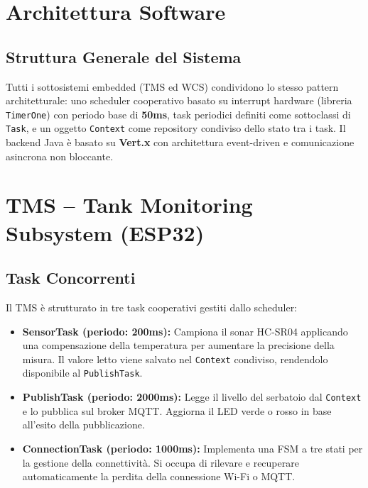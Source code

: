 \documentclass[12pt, a4paper]{article}
\begin{document}
\section{Architettura Software}

\subsection{Struttura Generale del Sistema}

Tutti i sottosistemi embedded (TMS ed WCS) condividono lo stesso pattern architetturale: uno scheduler cooperativo basato su interrupt hardware (libreria \texttt{TimerOne}) con periodo base di \textbf{50ms}, task periodici definiti come sottoclassi di \texttt{Task}, e un oggetto \texttt{Context} come repository condiviso dello stato tra i task. Il backend Java è basato su \textbf{Vert.x} con architettura event-driven e comunicazione asincrona non bloccante.


\section{TMS -- Tank Monitoring Subsystem (ESP32)}

\subsection{Task Concorrenti}

Il TMS è strutturato in tre task cooperativi gestiti dallo scheduler:

\begin{itemize}
    \item \textbf{SensorTask (periodo: 200ms):} Campiona il sonar HC-SR04 applicando una compensazione della temperatura per aumentare la precisione della misura. Il valore letto viene salvato nel \texttt{Context} condiviso, rendendolo disponibile al \texttt{PublishTask}.

    \item \textbf{PublishTask (periodo: 2000ms):} Legge il livello del serbatoio dal \texttt{Context} e lo pubblica sul broker MQTT. Aggiorna il LED verde o rosso in base all'esito della pubblicazione.

    \item \textbf{ConnectionTask (periodo: 1000ms):} Implementa una FSM a tre stati per la gestione della connettività. Si occupa di rilevare e recuperare automaticamente la perdita della connessione Wi-Fi o MQTT.
\end{itemize}
\end{document}
